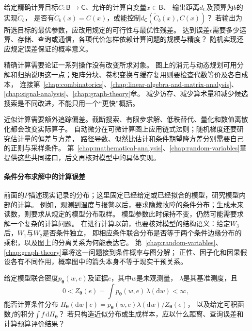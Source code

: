 \begin{mathproblem}
  \label{question:future-computation}
  给定精确计算目标$C:\mathsf B\to\mathsf C$、允许的计算自变量$x\in\mathsf B$、
  输出距离$d_{\mathsf C}$及预算为$b$的实现$\widetilde C_b$，
  是否有$\widetilde C_b(x)=C(x)$，或能控制$d_{\mathsf C}(\widetilde C_b(x),C(x))$？
  若输出为所选目标的最优参数，应改用规定的可行性与最优性残差。
  达到误差$\epsilon$需要多少运算、存储、查询或通信，各项代价怎样依赖计算问题的规模与精度？
  随机实现还应规定误差保证的概率意义。
\end{mathproblem}

精确计算需要论证一系列操作没有改变所求对象。
图上的消元与动态规划可用分解和归纳说明这一点；矩阵分块、卷积变换与缓存复用则要检查代数等价及各自成本，
连接第~\ref{chap:combinatorics}、\ref{chap:linear-algebra-and-matrix-analysis}、\ref{chap:signal-analysis}、\ref{chap:graph-theory}章。
减少访存、减少算术量和减少候选搜索是不同改进，不能只用一个“更快”概括。

近似计算需要额外追踪偏差。截断搜索、有限步求解、低秩替代、量化和数值离散化都会改变实际算子。
自动微分在可微计算图上应用链式法则；随机梯度还要研究估计量的偏差与方差，
路径导数、似然比估计和条件期望降方差分别需要自己的正则与采样条件。
第~\ref{chap:mathematical-analysis}、\ref{chap:random-variables}章提供这些共同接口，后文再核对模型中的具体实现。

\paragraph{条件分布求解中的计算误差}
\label{sec:future-analysis-probabilistic-query}

前面的$P$描述现实记录的分布；这里固定已经给定或已经拟合的模型，研究模型内部的计算。
例如，观测到温度与报警以后，要求隐藏故障的条件分布；生成未来读数，则要求从规定的模型分布取样。
模型参数此时保持不变，仍然可能需要求解一个复杂的计算问题。
在进行计算以前，也要核对模型的结构语义：给定$W_3$后，$W_1$与$W_2$是否条件独立，
即相应条件联合分布是否等于两个条件边缘分布的乘积，以及图上的分离关系为何能表达它。
第~\ref{chap:random-variables}、\ref{chap:graph-theory}章将这一问题接到条件概率与图分解；
正性、因子化和因果假设各有不同作用，概率图中的箭头本身不等于现实干预关系。

\begin{mathproblem}
  \label{question:future-probabilistic-query}
  给定模型联合密度$p_{\bm\theta}(w,e)$及证据$e$，其中$w$是未观测量，
  $\lambda$是其基准测度，且
  \[
    0<Z_{\bm\theta}(e)=\int p_{\bm\theta}(w,e)\,\lambda(\mathrm dw)<\infty,
  \]
  能否计算条件分布
  $\Pi_{\bm\theta}(\mathrm dw\mid e)=p_{\bm\theta}(w,e)\lambda(\mathrm dw)/Z_{\bm\theta}(e)$，
  以及给定可积函数$f$的积分$\int f\,\mathrm d\Pi_{\bm\theta}$？
  若只构造近似分布或生成样本，应以什么距离、查询误差和计算预算评价结果？
\end{mathproblem}

